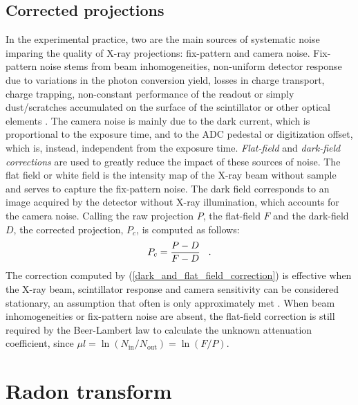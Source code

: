 {\subsection{Corrected projections}
In the experimental practice, two are the main sources of systematic noise imparing the quality of X-ray projections:
fix-pattern and camera noise.
Fix-pattern noise stems from beam inhomogeneities, non-uniform detector response due to variations in the photon conversion yield,
losses in charge transport, charge trapping, non-constant performance of the readout or simply dust/scratches accumulated
on the surface of the scintillator or other optical elements \cite{Tlustos2003}. The camera noise is mainly due to the dark current, which
is proportional to the exposure time, and to the ADC pedestal or digitization offset, which is, instead, independent from the
exposure time.
\newline
\textit{Flat-field} and \textit{dark-field corrections} are used to greatly reduce the impact of these sources of noise.
The flat field or white field is the intensity map of the X-ray beam without sample and serves to capture the fix-pattern noise. 
The dark field corresponds to an image acquired by the detector without X-ray illumination, which accounts for the camera noise.
Calling the raw projection $P$, the flat-field $F$ and the dark-field $D$, the corrected projection, $P_{c}$, is computed as follows:
\begin{equation}
  P_{c} = \frac{P-D}{F-D} \hspace{0.3cm}.
  \label{dark_and_flat_field_correction}
\end{equation}
The correction computed by (\ref{dark_and_flat_field_correction}) is effective when the X-ray beam, scintillator response and 
camera sensitivity can be considered stationary, an assumption that often is only approximately met \cite{VanNieuwenhove2015}.
When beam inhomogeneities or fix-pattern noise are absent, the flat-field correction is still required by the Beer-Lambert law
to calculate the unknown attenuation coefficient, since $\mu l = \ln(N_{\text{in}}/N_{\text{out}}) = \ln(F/P)$. 



\section{Radon transform}

}
